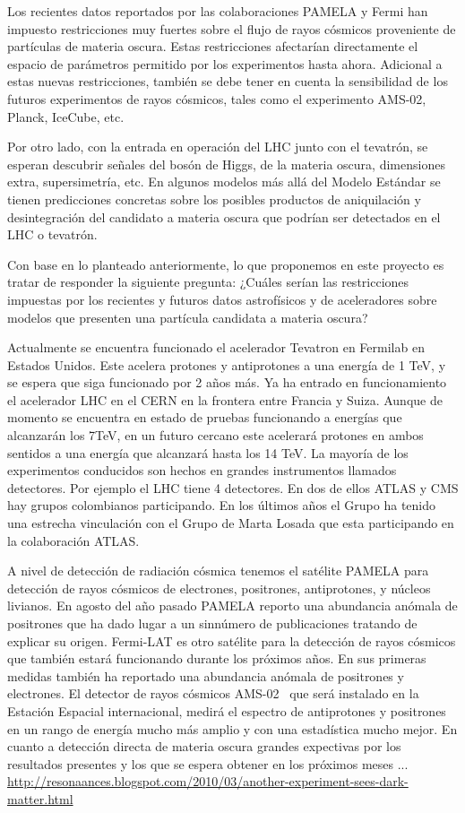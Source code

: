 \begin{ideas}
  \newpage{}
Los recientes datos reportados por las colaboraciones PAMELA y Fermi han impuesto restricciones muy fuertes sobre el flujo de rayos cósmicos proveniente de partículas de materia oscura. Estas restricciones afectarían directamente el espacio de parámetros permitido por los experimentos hasta ahora. Adicional a estas nuevas restricciones, también se debe tener en cuenta la sensibilidad de los futuros experimentos de rayos cósmicos, tales como el experimento AMS-02, Planck, IceCube, etc.

Por otro lado, con la entrada en operación del LHC junto con el tevatrón, se esperan descubrir señales del bosón de Higgs, de la materia oscura, dimensiones extra, supersimetría, etc. En algunos modelos más allá del Modelo Estándar se tienen predicciones concretas sobre los posibles productos de aniquilación y desintegración del candidato a materia oscura que podrían ser detectados en el LHC o tevatrón.

Con base en lo planteado anteriormente, lo que proponemos en este proyecto es tratar de responder la siguiente pregunta: ¿Cuáles serían las restricciones impuestas por los recientes y futuros datos astrofísicos y de aceleradores sobre  modelos que presenten una partícula candidata a materia oscura?

Actualmente se encuentra funcionado el acelerador Tevatron en Fermilab en Estados Unidos. Este acelera protones y antiprotones a una energía de 1 TeV, y se espera que siga funcionado por 2 años más. Ya ha entrado en funcionamiento el acelerador LHC en el CERN en la frontera entre Francia y Suiza. Aunque de momento se encuentra en estado de pruebas funcionando a energías que alcanzarán los 7TeV, en un futuro cercano este  acelerará protones en ambos sentidos a una energía que alcanzará hasta los 14 TeV. La mayoría de los experimentos conducidos son hechos en grandes instrumentos llamados detectores. Por ejemplo el LHC tiene 4 detectores. En dos de ellos ATLAS y CMS hay grupos colombianos participando. En los últimos años el Grupo ha tenido una estrecha vinculación con el Grupo de Marta Losada que esta participando en la colaboración ATLAS.

A nivel de detección de radiación cósmica tenemos el satélite PAMELA para detección de rayos cósmicos de electrones, positrones, antiprotones, y núcleos livianos. En agosto del año pasado PAMELA reporto una abundancia anómala de positrones %
que ha dado lugar a un sinnúmero de publicaciones tratando de explicar su origen.  Fermi-LAT es otro satélite para la detección de rayos cósmicos que también estará funcionando  durante los próximos años. En sus primeras medidas %
también ha reportado una abundancia anómala de positrones y electrones. El detector de rayos cósmicos AMS-02~%
que será instalado en la Estación Espacial  internacional, medirá el espectro de antiprotones y positrones en un rango de energía mucho más amplio y con una estadística mucho mejor. En cuanto a detección directa de materia oscura grandes expectivas por los resultados presentes y los que se espera obtener en los próximos meses ... \url{http://resonaances.blogspot.com/2010/03/another-experiment-sees-dark-matter.html}


\end{ideas}
